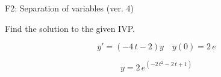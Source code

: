 \begin{exercise}
  \begin{exerciseTitle}F2: Separation of variables (ver. 4)\end{exerciseTitle}
  \begin{exerciseStatement}
    
Find the solution to the given IVP.

    
\[y'=( -4 \, t - 2 )y\hspace{1em} y(0)= 2 \, e\]

  \end{exerciseStatement}
  \begin{exerciseAnswer}
    
\[y= 2 \, e^{\left(-2 \, t^{2} - 2 \, t + 1\right)}\]

  \end{exerciseAnswer}
\end{exercise}